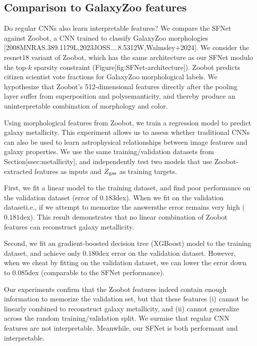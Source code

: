 \documentclass[11pt,a4paper]{article}
\begin{document}
\subsection{Comparison to GalaxyZoo features}

Do regular CNNs also learn interpretable features? We compare the SFNet against Zoobot, a CNN trained to classify GalaxyZoo morphologies [2008MNRAS.389.1179L,2023JOSS....8.5312W,Walmsley+2024]. We consider the resnet18 variant of Zoobot, which has the same architecture as our SFNet modulo the top-$k$ sparsity constraint (Figure[fig:SFNet-architecture]). Zoobot predicts citizen scientist vote fractions for GalaxyZoo morphological labels. We hypothesize that Zoobot's 512-dimensional features directly after the pooling layer suffer from superposition and polysemanticity, and thereby produce an uninterpretable combination of morphology and color.

Using morphological features from Zoobot, we train a regression model to predict galaxy metallicity. This experiment allows us to assess whether traditional CNNs can also be used to learn astrophysical relationships between image features and galaxy properties.  We use the same training/validation datasets from Section[ssec:metallicity], and independently test two models that use Zoobot-extracted features as inputs and $Z_{\rm gas}$ as training targets.

First, we fit a linear model to the training dataset, and find poor performance on the validation dataset (error of $0.183$dex). When we fit on the validation dataseti.e., if we attempt to memorize the answersthe error remains very high ($0.181$dex). This result demonstrates that no linear combination of Zoobot features can reconstruct galaxy metallicity.

Second, we fit an gradient-boosted decision tree (XGBoost) model to the training dataset, and achieve only $0.180$dex error on the validation dataset. However, when we cheat by fitting on the validation dataset, we can lower the error down to $0.085$dex (comparable to the SFNet performance).

Our experiments confirm that the Zoobot features indeed contain enough information to memorize the validation set, but that these features (i) cannot be linearly combined to reconstruct galaxy metallicity, and (ii) cannot generalize across the random training/validation split. We surmise that regular CNN features are not interpretable. Meanwhile, our SFNet is both performant and interpretable.
\end{document}
